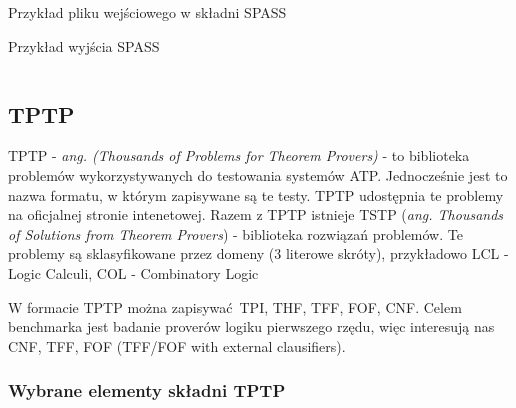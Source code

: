 \documentclass[a4paper,12pt]{article}
\newenvironment{longlisting}{\captionsetup{type=listing}}{}
\begin{document}
\begin{longlisting}
  \caption{Przykład pliku wejściowego w składni SPASS}
\end{longlisting}

\begin{longlisting}
  \caption{Przykład wyjścia SPASS}
  \inputminted{text}{listings/spass_example.out}
\end{longlisting}

\subsection{TPTP}

TPTP - \textit{ang. (Thousands of Problems for Theorem Provers)} - to biblioteka problemów wykorzystywanych do testowania systemów \gls{ATP}. Jednocześnie jest to nazwa formatu, w którym zapisywane są te testy. TPTP udostępnia te problemy na oficjalnej stronie intenetowej. Razem z TPTP istnieje TSTP (\textit{ang. Thousands of Solutions from Theorem Provers}) - biblioteka rozwiązań problemów.
Te problemy są sklasyfikowane przez domeny (3 literowe skróty), przykładowo LCL - Logic Calculi, COL - Combinatory Logic

W formacie TPTP można zapisywać \gls{TPI}, \gls{THF}, \gls{TFF}, \gls{FOF}, \gls{CNF}. Celem benchmarka jest badanie proverów logiku pierwszego rzędu, więc interesują nas \gls{CNF}, \gls{TFF}, \gls{FOF} (TFF/FOF with external clausifiers).

\subsubsection{Wybrane elementy składni TPTP}
\end{document}
